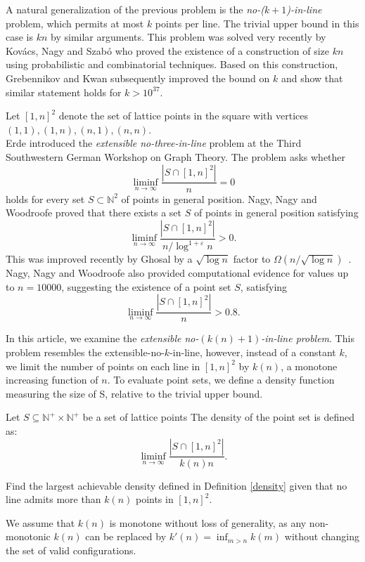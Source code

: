 \documentclass[11pt,a4paper]{article}
\numberwithin{equation}{section}
\newcommand{\nn}{\mathbb{N}}
\begin{document}
A natural generalization of the previous problem is the \textit{no-($k+1$)-in-line} problem, which permits at most $k$ points per line. The trivial upper bound in this case is $kn$ by similar arguments. This problem was solved very recently by Kovács, Nagy and Szabó \cite{kovacs2025settling} who proved  the existence of a construction of size $kn$ using probabilistic and combinatorial techniques.  Based on this construction, Grebennikov and Kwan \cite{grebennikov2025nok1inlineproblemlargeconstant}  subsequently improved the bound on $k$ and show that  similar statement holds for $k>10^{37}$.



Let $[1,n]^2$ denote the set of lattice points in the square with vertices $(1,1), (1, n), (n, 1), (n, n)$. \\
Erde introduced the \textit{extensible no-three-in-line} problem at the Third Southwestern German Workshop
on Graph Theory. The problem asks whether $$\displaystyle\liminf_{n\to \infty}\frac{\left|S\cap[1,n]^{2}\right|}{n}=0$$
holds for every set $S\subset \mathbb{N}^2$ of points in general position. Nagy, Nagy and Woodroofe \cite{nagy2023extensible} proved that there exists a set $S$ of points in general position satisfying $$\displaystyle\liminf_{n\to \infty}\frac{\left|S\cap[1,n]^{2}\right|}{n/\log^{1+\varepsilon}n}>0.$$
This was improved recently by Ghosal by a $\sqrt{\log n}$ factor to $\Omega(n/\sqrt{\log n})$~\cite{ghosal2026note}.
Nagy, Nagy and Woodroofe also provided computational evidence for values up to $n=10000$, suggesting the existence of a point set $S$, satisfying $$\displaystyle\liminf_{n\to \infty}\frac{\left|S\cap[1,n]^{2}\right|}{n}>0.8.$$ 

\noindent In this article, we examine the \textit{extensible no-$(k(n)+1)$-in-line problem}. This problem resembles the extensible-no-$k$-in-line, however, instead of a constant $k$, we limit the number of points on each line in $[1,n]^2$ by $k(n)$, a monotone increasing function of $n$. To evaluate point sets, we define a density function measuring the size of S, relative to the trivial upper bound.

\begin{definition}[Density]
\label{density}
 Let  $S\subseteq\nn^+\times \nn^+$ be a set of lattice points
 The density of the point set is defined as:
\[
\liminf_{n\to \infty}\frac{\left|S\cap[1,n]^{2}\right|}{k(n)n}.
\]
\end{definition}

\begin{problem}\label{que:Erde}
Find the largest achievable density defined in Definition \ref{density} given that no line admits more than $k(n)$ points in $[1,n]^2$.

\begin{remark}
     We assume that $k(n)$ is monotone without loss of generality, as any non-monotonic $k(n)$ can be replaced by $k'(n)=\inf_{m>n}k(m)$ without changing the set of valid configurations.
    \noindent
\end{remark}

\end{problem}
\end{document}
